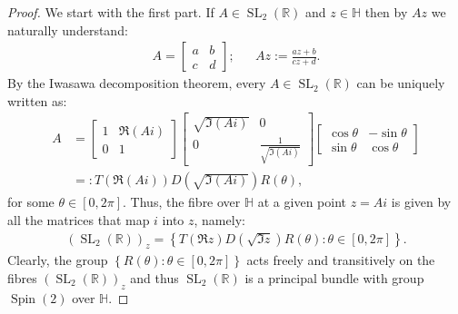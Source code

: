 \documentclass[12pt]{amsart}
\theoremstyle{definition}
\def\RR{{\mathbb R}}
\def\HH{{\mathbb{H}}}
\newcommand{\slinear}{\operatorname{SL}}
\newcommand{\spin}{\operatorname{Spin}}
\begin{document}
\begin{proof}
We start with the first part. If $A\in \slinear_2(\RR)$ and $z\in \HH$ then by $Az$ we naturally understand:
\begin{align*}
A = 
\begin{bmatrix} a & b \\ c & d   \end{bmatrix};
&&
Az := \frac{az+b}{cz +d}.
\end{align*}
By the Iwasawa decomposition theorem, every $A\in \slinear_2(\RR)$ can be uniquely written as:
\begin{align*}
A &= 
\begin{bmatrix} 
1 & \Re (Ai) \\ 
0 &   1
\end{bmatrix}
\begin{bmatrix} 
\sqrt{\Im(Ai)} & 0 \\ 
0 &   \frac{1}{\sqrt{\Im(Ai)}}
\end{bmatrix}
\begin{bmatrix} 
\cos \theta & -\sin \theta \\ 
\sin \theta &   \cos \theta 
\end{bmatrix}
\\
&
=: T(\Re(Ai))D\left(\sqrt{\Im(Ai)}\right)R(\theta)
,
\end{align*}
for some $\theta \in [0,2\pi]$. Thus, the fibre over $\HH$ at a given point $z=Ai$ is given by all the matrices that map $i$ into $z$, namely:
\begin{align*}
(\slinear_2(\RR))_z = 
\left\lbrace
T(\Re z)D\left( \sqrt{\Im z}\right) R(\theta)
:
\theta \in [0,2\pi]
\right\rbrace.
\end{align*}
Clearly, the group $\left\lbrace
R(\theta)
:
\theta \in [0,2\pi]
\right\rbrace$ acts freely and transitively on the fibres $(\slinear_2(\RR))_z$ and thus $\slinear_2(\RR)$ is a principal bundle with group $\spin(2)$ over $\HH$. 


\end{proof}
\end{document}
